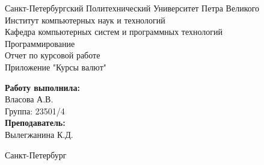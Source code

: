 \documentclass[a4paper]{article}
\begin{document}

\begin{titlepage}	%

	\begin{center}		%

		\large Санкт-Петербургский Политехнический Университет Петра Великого\\
		\large Институт компьютерных наук и технологий \\
		\large Кафедра компьютерных систем и программных технологий\\[6cm]
		
		\huge Программирование\\[0.5cm] %
		\large Отчет по курсовой работе \\[0.1cm]
		\large Приложение "Курсы валют"\\[5cm]

	\end{center}


	\begin{flushright} %
		\begin{minipage}{0.25\textwidth} %
			\begin{flushleft} %

				\large\textbf{Работу выполнила:}\\
				\large Власова А.В.\\
				\large {Группа:} 23501/4\\
				
				\large \textbf{Преподаватель:}\\
				\large Вылегжанина К.Д.

			\end{flushleft}
		\end{minipage}
	\end{flushright}
	
	\vfill %

	\begin{center}
	\large Санкт-Петербург\\
	\large \the\year %
	\end{center} %

\thispagestyle{empty} %
\end{titlepage} %
\end{document}
